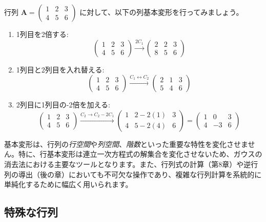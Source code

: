 \begin{ex}
行列 $\bm{A} = \begin{pmatrix} 1 & 2 & 3 \\ 4 & 5 & 6 \end{pmatrix}$ に対して、以下の列基本変形を行ってみましょう。
\begin{enumerate}
    \item 1列目を2倍する:
    \[ \begin{pmatrix} 1 & 2 & 3 \\ 4 & 5 & 6 \end{pmatrix} \xrightarrow{2C_1} \begin{pmatrix} 2 & 2 & 3 \\ 8 & 5 & 6 \end{pmatrix} \]
    \item 1列目と2列目を入れ替える:
    \[ \begin{pmatrix} 1 & 2 & 3 \\ 4 & 5 & 6 \end{pmatrix} \xrightarrow{C_1 \leftrightarrow C_2} \begin{pmatrix} 2 & 1 & 3 \\ 5 & 4 & 6 \end{pmatrix} \]
    \item 2列目に1列目の-2倍を加える:
    \[ \begin{pmatrix} 1 & 2 & 3 \\ 4 & 5 & 6 \end{pmatrix} \xrightarrow{C_2 \to C_2 - 2C_1} \begin{pmatrix} 1 & 2-2(1) & 3 \\ 4 & 5-2(4) & 6 \end{pmatrix} = \begin{pmatrix} 1 & 0 & 3 \\ 4 & -3 & 6 \end{pmatrix} \]
\end{enumerate}
\end{ex}

\begin{rmk*}
基本変形は、行列の\emph{行空間}や\emph{列空間}、\emph{階数}といった重要な特性を変化させません。特に、行基本変形は連立一次方程式の解集合を変化させないため、ガウスの消去法における主要なツールとなります。また、行列式の計算（第8章）や逆行列の導出（後の章）においても不可欠な操作であり、複雑な行列計算を系統的に単純化するために幅広く用いられます。
\end{rmk*}

\subsection{特殊な行列}

